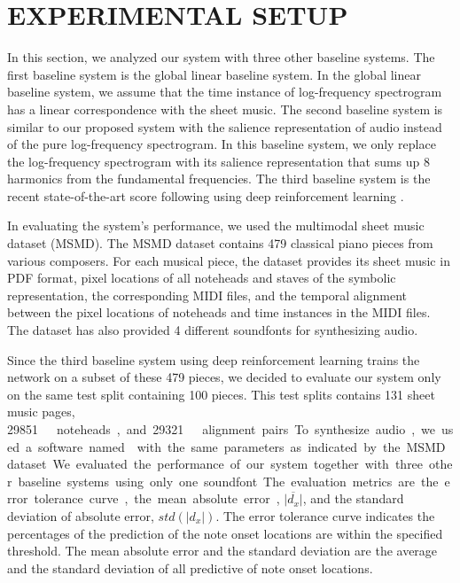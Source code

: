 \documentclass[letterpaper, 10pt, conference]{ieeeconf}  %
\begin{document}
\section{EXPERIMENTAL SETUP}
In this section, we analyzed our system with three other baseline systems. The first baseline system is the global linear baseline system. In the global linear baseline system, we assume that the time instance of log-frequency spectrogram has a linear correspondence with the sheet music. The second baseline system is similar to our proposed system with the salience representation of audio instead of the pure log-frequency spectrogram. In this baseline system, we only replace the log-frequency spectrogram with its salience representation that sums up 8 harmonics from the fundamental frequencies. The third baseline system is the recent state-of-the-art score following using deep reinforcement learning \cite{dorfer}.

In evaluating the system's performance, we used the multimodal sheet music dataset (MSMD). The MSMD dataset contains 479 classical piano pieces from various composers. For each musical piece, the dataset provides its sheet music in PDF format, pixel locations of all noteheads and staves of the symbolic representation, the corresponding MIDI files, and the temporal alignment between the pixel locations of noteheads and time instances in the MIDI files. The dataset has also provided 4 different soundfonts for synthesizing audio. 

Since the third baseline system using deep reinforcement learning \cite{dorfer} trains the network on a subset of these 479 pieces, we decided to evaluate our system only on the same test split containing 100 pieces. This test splits contains 131 sheet music pages, \SI{29851}{~}noteheads, and \SI{29321}{~}alignment pairs. To synthesize audio, we used a software named \cite{fluidsynth} with the same parameters as indicated by the MSMD dataset. We evaluated the performance of our system together with three other baseline systems using only one soundfont.

The evaluation metrics are the error tolerance curve, the mean absolute error, $\overline{|d_x|}$, and the standard deviation of absolute error, $std(|d_x|)$. The error tolerance curve indicates the percentages of the prediction of the note onset locations are within the specified threshold. The mean absolute error and the standard deviation are the average and the standard deviation of all predictive of note onset locations.
\end{document}
